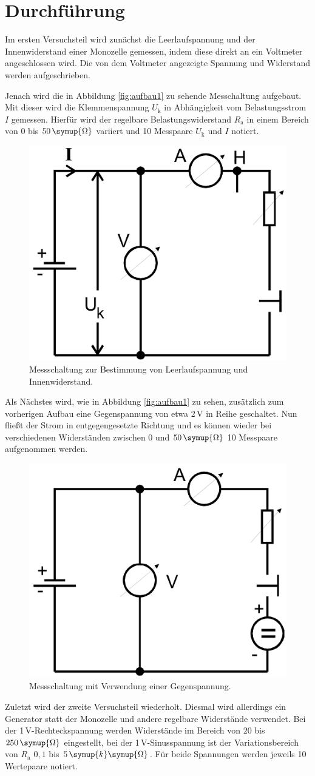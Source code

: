 \section{Durchführung}
Im ersten Versuchsteil wird zunächst die Leerlaufspannung und der Innenwiderstand einer Monozelle gemessen, indem diese direkt an ein Voltmeter angeschlossen wird.
Die von dem Voltmeter angezeigte Spannung und Widerstand werden aufgeschrieben.

Jenach wird die in Abbildung \eqref{fig:aufbau1} zu sehende Messchaltung aufgebaut. Mit dieser wird die Klemmenspannung $U_{\text{k}}$ in Abhängigkeit vom Belastungsstrom $I$ gemessen.
Hierfür wird der regelbare Belastungswiderstand $R_{\text{a}}$ in einem Bereich von $0$ bis $50\,\symup{\Omega}$ variiert und 10 Messpaare $U_{\text{k}}$ und $I$ notiert.
   \begin{figure}[h!]
   \centering
   \includegraphics[width=0.4\linewidth]{aufbau1.png}
   \caption{Messschaltung zur Bestimmung von Leerlaufspannung und Innenwiderstand.}
   \label{fig:aufbau1}
   \end{figure}

Als Nächstes wird, wie in Abbildung \eqref{fig:aufbau1} zu sehen, zusätzlich zum vorherigen Aufbau eine Gegenspannung von etwa 2\,V in Reihe geschaltet. Nun fließt der Strom in entgegengesetzte Richtung und es können wieder bei 
verschiedenen Widerständen zwischen $0$ und $50\,\symup{\Omega}$ 10 Messpaare aufgenommen werden.
   \begin{figure}[h!]
   \centering
   \includegraphics[width=0.4\linewidth]{aufbau2.png}
   \caption{Messschaltung mit Verwendung einer Gegenspannung.}
   \label{fig:aufbau2}
   \end{figure}

Zuletzt wird der zweite Versuchsteil wiederholt. Diesmal wird allerdings ein Generator statt der Monozelle und andere regelbare Widerstände verwendet. Bei der 1\,V-Rechteckspannung werden Widerstände im Bereich von 
$20$ bis $250\,\symup{\Omega}$ eingestellt, bei der 1\,V-Sinusspannung ist der Variationsbereich von $R_{\text{a}}$ $0{,}1$ bis $5\,\symup{k}\symup{\Omega}$. Für beide Spannungen werden jeweils 10 Wertepaare notiert.